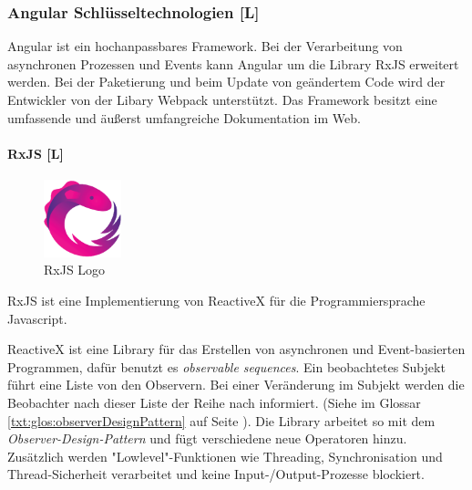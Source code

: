 \subsubsection{Angular Schlüsseltechnologien [L]}
Angular ist ein hochanpassbares Framework. Bei der Verarbeitung von asynchronen Prozessen und Events kann Angular um die Library RxJS erweitert werden. Bei der Paketierung und beim Update von geändertem Code wird der Entwickler von der Libary Webpack unterstützt. Das Framework besitzt eine umfassende und äußerst umfangreiche Dokumentation im Web.
\paragraph{RxJS [L]}
\begin{figure}
  \begin{center}
    \includegraphics[width=0.2\textwidth]{pics/RxJs_logo.png}
   \caption{RxJS Logo}
  \end{center}
\end{figure}
RxJS ist eine Implementierung von ReactiveX für die Programmiersprache Javascript.

ReactiveX ist eine Library für das Erstellen von asynchronen und Event-basierten Programmen, dafür benutzt es \emph{observable sequences}. Ein beobachtetes Subjekt führt eine Liste von den Observern. Bei einer Veränderung im Subjekt werden die Beobachter nach dieser Liste der Reihe nach informiert. (Siehe im Glossar \ref{txt:glos:observerDesignPattern} auf Seite \pageref{txt:glos:observerDesignPattern}).
Die Library arbeitet so mit dem \emph{Observer-Design-Pattern} und fügt verschiedene neue Operatoren hinzu. Zusätzlich werden "Lowlevel"-Funktionen wie Threading, Synchronisation und Thread-Sicherheit verarbeitet und keine Input-/Output-Prozesse blockiert. \cite{ReactiveXIntro}

